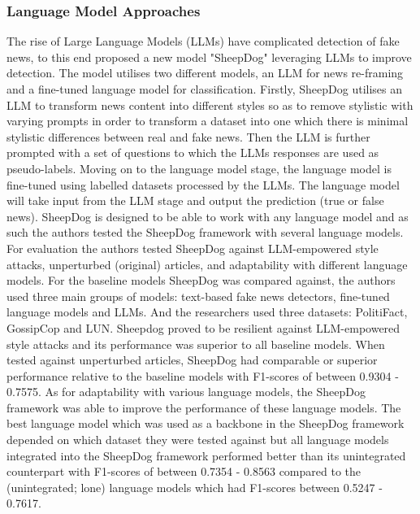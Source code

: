 \documentclass[stu,12pt,floatsintext,donotrepeattitle]{apa7}
\begin{document}
\subsubsection{Language Model Approaches}
The rise of Large Language Models (LLMs) have complicated detection of fake news, to this end \parencite{sheepdog} proposed a new model "SheepDog" leveraging LLMs to improve detection. The model utilises two different models, an LLM for news re-framing and a fine-tuned language model for classification. Firstly, SheepDog utilises an LLM to transform news content into different styles so as to remove stylistic with varying prompts in order to transform a dataset into one which there is minimal stylistic differences between real and fake news. Then the LLM is further prompted with a set of questions to which the LLMs responses are used as pseudo-labels. Moving on to the language model stage, the language model is fine-tuned using labelled datasets processed by the LLMs. The language model will take input from the LLM stage and output the prediction (true or false news). SheepDog is designed to be able to work with any language model and as such the authors tested the SheepDog framework with several language models. For evaluation the authors tested SheepDog against LLM-empowered style attacks, unperturbed (original) articles, and adaptability with different language models. For the baseline models SheepDog was compared against, the authors used three main groups of models: text-based fake news detectors, fine-tuned language models and LLMs. And the researchers used three datasets: PolitiFact, GossipCop and LUN. Sheepdog proved to be resilient against LLM-empowered style attacks and its performance was superior to all baseline models. When tested against unperturbed articles, SheepDog had comparable or superior performance relative to the baseline models with F1-scores of between 0.9304 - 0.7575. As for adaptability with various language models, the SheepDog framework was able to improve the performance of these language models. The best language model which was used as a backbone in the SheepDog framework depended on which dataset they were tested against but all language models integrated into the SheepDog framework performed better than its unintegrated counterpart with F1-scores of between 0.7354 - 0.8563 compared to the (unintegrated; lone) language models which had F1-scores between 0.5247 - 0.7617. 
\end{document}

